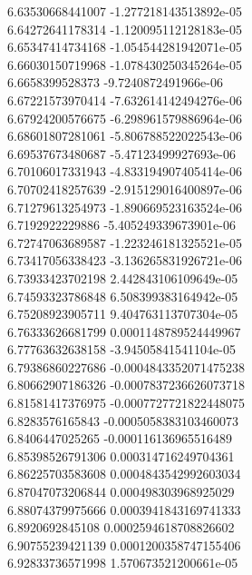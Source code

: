 {6.63530668441007 -1.277218143513892e-05 \\
6.64272641178314 -1.120095112128183e-05 \\
6.65347414734168 -1.054544281942071e-05 \\
6.66030150719968 -1.078430250345264e-05 \\
6.6658399528373 -9.7240872491966e-06 \\
6.67221573970414 -7.632614142494276e-06 \\
6.67924200576675 -6.298961579886964e-06 \\
6.68601807281061 -5.806788522022543e-06 \\
6.69537673480687 -5.47123499927693e-06 \\
6.70106017331943 -4.833194907405414e-06 \\
6.70702418257639 -2.915129016400897e-06 \\
6.71279613254973 -1.890669523163524e-06 \\
6.7192922229886 -5.405249339673901e-06 \\
6.72747063689587 -1.223246181325521e-05 \\
6.73417056338423 -3.136265831926721e-06 \\
6.73933423702198 2.442843106109649e-05 \\
6.74593323786848 6.508399383164942e-05 \\
6.75208923905711 9.404763113707304e-05 \\
6.76333626681799 0.0001148789524449967 \\
6.77763632638158 -3.94505841541104e-05 \\
6.79386860227686 -0.0004843352071475238 \\
6.80662907186326 -0.0007837236626073718 \\
6.81581417376975 -0.0007727721822448075 \\
6.8283576165843 -0.0005058383103460073 \\
6.8406447025265 -0.000116136965516489 \\
6.85398526791306 0.000314716249704361 \\
6.86225703583608 0.0004843542992603034 \\
6.87047073206844 0.000498303968925029 \\
6.88074379975666 0.0003941843169741333 \\
6.8920692845108 0.0002594618708826602 \\
6.90755239421139 0.0001200358747155406 \\
6.92833736571998 1.570673521200661e-05 \\
}
